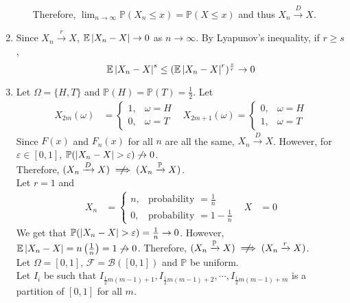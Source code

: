 \documentclass{huhtakm-template-book}
\newcommand{\prob}{\mathbb{P}}
\newcommand{\expect}{\mathbb{E}}
\begin{document}
\begin{proofing}
\begin{enumerate}
\begin{enumerate}
\begin{equation*}
            \end{equation*}
            Therefore, $\lim_{n\to\infty}\prob(X_{n}\leq x)=\prob(X\leq x)$ and thus $X_{n}\xrightarrow{D}X$.
        \end{enumerate}
        \item Since $X_{n}\xrightarrow{r}X$, $\expect\abs{X_{n}-X}\to 0$ as $n\to\infty$. By Lyapunov's inequality, if $r\geq s$,
        \begin{equation*}
            \expect\abs{X_{n}-X}^{s}\leq(\expect\abs{X_{n}-X}^{r})^{\frac{s}{r}}\to 0
        \end{equation*}
        \item Let $\Omega=\{H,T\}$ and $\prob(H)=\prob(T)=\frac{1}{2}$. Let
        \begin{align*}
            X_{2m}(\omega)&=\begin{cases}
                1, &\omega=H\\
                0, &\omega=T
            \end{cases} & X_{2m+1}(\omega)=\begin{cases}
                0, &\omega=H\\
                1, &\omega=T
            \end{cases}
        \end{align*}
        Since $F(x)$ and $F_{n}(x)$ for all $n$ are all the same, $X_{n}\xrightarrow{D}X$. However, for $\varepsilon\in[0,1]$, $\prob(\abs{X_{n}-X}>\varepsilon)\not\to 0$.\\
        Therefore, $(X_{n}\xrightarrow{D}X)\centernot\implies(X_{n}\xrightarrow{\prob}X)$.\\
        Let $r=1$ and
        \begin{align*}
            X_{n}&=\begin{cases}
                n, &\text{probability }=\frac{1}{n}\\
                0, &\text{probability }=1-\frac{1}{n}
            \end{cases} & X&=0
        \end{align*}
        We get that $\prob(\abs{X_{n}-X}>\varepsilon)=\frac{1}{n}\to 0$. However, $\expect\abs{X_{n}-X}=n\left(\frac{1}{n}\right)=1\not\to 0$. Therefore, $(X_{n}\xrightarrow{\prob}X)\centernot\implies(X_{n}\xrightarrow{r}X)$.\\
        Let $\Omega=[0,1]$, $\mathcal{F}=\mathcal{B}([0,1])$ and $\prob$ be uniform.\\
        Let $I_{i}$ be such that $I_{\frac{1}{2}m(m-1)+1}, I_{\frac{1}{2}m(m-1)+2}, \cdots, I_{\frac{1}{2}m(m-1)+m}$ is a partition of $[0,1]$ for all $m$.\\

\end{enumerate}
\end{proofing}
\end{document}
